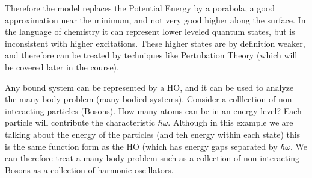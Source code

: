 \documentclass{article}
\begin{document}
Therefore the model replaces the Potential Energy by a porabola, a good approximation near the minimum, and not very good higher along the surface.
In the language of chemistry it can represent lower leveled quantum states, but is inconsistent with higher excitations.
These higher states are by definition weaker, and therefore can be treated by techniques like Pertubation Theory (which will be covered later in the course).

Any bound system can be represented by a HO, and it can be used to analyze the many-body problem (many bodied systems).
Consider a colllection of non-interacting particles (Bosons).
How many atoms can be in an energy level?
Each particle will contribute the characteristic $\hbar \omega$.
Although in this example we are talking about the energy of the particles (and teh energy within each state) this is the same function  form as the HO (which has energy gaps separated by $\hbar \omega$.
We can therefore treat a many-body problem such as a collection of non-interacting Bosons as a collection of harmonic oscillators.
\end{document}
